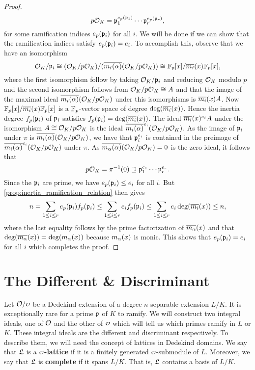 \begin{proof}
      \[
        p\mathcal{O}_{K} = \mathfrak{p}_{1}^{e_{p}(\mathfrak{p}_{1})} \cdots \mathfrak{p}_{r}^{e_{p}(\mathfrak{p}_{r})},
      \]
      for some ramification indices $e_{p}(\mathfrak{p}_{i})$ for all $i$. We will be done if we can show that the ramification indices satisfy $e_{p}(\mathfrak{p}_{i}) = e_{i}$. To accomplish this, observe that we have an isomorphism
      \[
        \mathcal{O}_{K}/\mathfrak{p}_{i} \cong (\mathcal{O}_{K}/p\mathcal{O}_{K})/(\overline{m_{i}(\alpha)}(\mathcal{O}_{K}/p\mathcal{O}_{K})) \cong \mathbb{F}_{p}[x]/\overline{m_{i}}(x)\mathbb{F}_{p}[x],
      \]
      where the first isomorphism follow by taking $\mathcal{O}_{K}/\mathfrak{p}_{i}$ and reducing $\mathcal{O}_{K}$ modulo $p$ and the second isomorphism follows from $\mathcal{O}_{K}/p\mathcal{O}_{K} \cong A$ and that the image of the maximal ideal $\overline{m_{i}(\alpha)}(\mathcal{O}_{K}/p\mathcal{O}_{K})$ under this isomorphisms is $\overline{m_{i}}(x)A$. Now $\mathbb{F}_{p}[x]/\overline{m_{i}}(x)\mathbb{F}_{p}[x]$ is a $\mathbb{F}_{p}$-vector space of degree $\deg(\overline{m_{i}}(x))$. Hence the inertia degree $f_{p}(\mathfrak{p}_{i})$ of $\mathfrak{p}_{i}$ satisfies $f_{p}(\mathfrak{p}_{i}) = \deg(\overline{m_{i}}(x))$. The ideal $\overline{m_{i}}(x)^{e_{i}}A$ under the isomorphism $A \cong \mathcal{O}_{K}/p\mathcal{O}_{K}$ is the ideal $\overline{m_{i}(\alpha)}^{e_{i}}(\mathcal{O}_{K}/p\mathcal{O}_{K})$. As the image of $\mathfrak{p}_{i}$ under $\pi$ is $\overline{m_{i}(\alpha)}(\mathcal{O}_{K}/p\mathcal{O}_{K})$, we have that $\mathfrak{p}_{i}^{e_{i}}$ is contained in the preimage of $\overline{m_{i}(\alpha)}^{e_{i}}(\mathcal{O}_{K}/p\mathcal{O}_{K})$ under $\pi$. As $\overline{m_{\alpha}(\alpha)}(\mathcal{O}_{K}/p\mathcal{O}_{K}) = 0$ is the zero ideal, it follows that
      \[
        p\mathcal{O}_{K} = \pi^{-1}(0) \supseteq \mathfrak{p}_{1}^{e_{1}} \cdots \mathfrak{p}_{r}^{e_{r}}.
      \]
      Since the $\mathfrak{p}_{i}$ are prime, we have $e_{p}(\mathfrak{p}_{i}) \le e_{i}$ for all $i$. But \cref{prop:inertia_ramification_relation} then gives
      \[
        n = \sum_{1 \le i \le r}e_{p}(\mathfrak{p}_{i})f_{p}(\mathfrak{p}_{i}) \le \sum_{1 \le i \le r}e_{i}f_{p}(\mathfrak{p}_{i}) \le \sum_{1 \le i \le r}e_{i}\deg(\overline{m_{i}}(x)) \le n,
      \]
      where the last equality follows by the prime factorization of $\overline{m_{\alpha}}(x)$ and that $\deg(\overline{m_{\alpha}}(x)) = \deg(m_{\alpha}(x))$ because $m_{\alpha}(x)$ is monic. This shows that $e_{p}(\mathfrak{p}_{i}) = e_{i}$ for all $i$ which completes the proof.
    \end{proof}
  \section{The Different \& Discriminant}
    Let $\mc{O}/\smc{O}$ be a Dedekind extension of a degree $n$ separable extension $L/K$. It is exceptionally rare for a prime $\mathfrak{p}$ of $K$ to ramify. We will construct two integral ideals, one of $\mathcal{O}$ and the other of $\smc{O}$ which will tell us which primes ramify in $L$ or $K$. These integral ideals are the different and discriminant respectively. To describe them, we will need the concept of lattices in Dedekind domains. We say that $\mathfrak{L}$ is a \textbf{$\smc{O}$-lattice} if it is a finitely generated $\smc{O}$-submodule of $L$. Moreover, we say that $\mathfrak{L}$ is \textbf{complete} if it spans $L/K$. That is, $\mathfrak{L}$ contains a basis of $L/K$.

